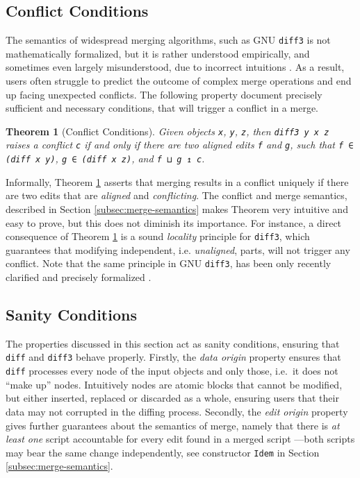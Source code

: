 \documentclass{sigplanconf}
\theoremstyle{plain}
\newtheorem{thm}{Theorem}
\begin{document}
\subsection{Conflict Conditions}
The semantics of widespread merging algorithms, such as GNU
\texttt{diff3} is not mathematically formalized, but it is rather
understood empirically, and sometimes even largely misunderstood, due
to incorrect intuitions \cite{PierceDiff3}.
%
As a result, users often struggle to predict the outcome of complex
merge operations and end up facing unexpected conflicts.
%
The following property document precisely sufficient and necessary
conditions, that will trigger a conflict in a merge.
%
\begin{thm}[Conflict Conditions]
\label{thm:conflict-conds}
  Given objects \texttt{x}, \texttt{y}, \texttt{z}, 
  then \texttt{diff3 y x z} raises a conflict \texttt{c} if and only if
  there are two aligned edits \texttt{f} and \texttt{g}, such that
  \texttt{f ∈ (diff x y)}, \texttt{g ∈ (diff x z)}, and \texttt{f ⊔ g ↥ c}.
\end{thm}
Informally, Theorem \ref{thm:conflict-conds} asserts that merging
results in a conflict uniquely if there are two edits that are
\emph{aligned} and \emph{conflicting}.
%
The conflict and merge semantics, described in Section
\ref{subsec:merge-semantics} makes Theorem very intuitive and easy to
prove, but this does not diminish its importance.
%
For instance, a direct consequence of Theorem \ref{thm:conflict-conds}
is a sound \emph{locality} principle for \texttt{diff3}, which
guarantees that modifying independent, i.e. \emph{unaligned}, parts,
will not trigger any conflict.
%
Note that the same principle in GNU \texttt{diff3}, has been only
recently clarified and precisely formalized \cite{PierceDiff3}.

\subsection{Sanity Conditions}
The properties discussed in this section act as sanity conditions,
ensuring that \texttt{diff} and \texttt{diff3} behave properly.
%
Firstly, the \emph{data origin} property ensures that \texttt{diff}
processes every node of the input objects and only those, i.e.\ it
does not ``make up'' nodes.
%
Intuitively nodes are atomic blocks that cannot be modified, but
either inserted, replaced or discarded as a whole, ensuring users that
their data may not corrupted in the diffing process.
%
Secondly, the \emph{edit origin} property gives further guarantees
about the semantics of merge, namely that there is \emph{at least one}
script accountable for every edit found in a merged script ---both
scripts may bear the same change independently, see constructor
\texttt{Idem} in Section \ref{subsec:merge-semantics}.
%
%
\end{document}
